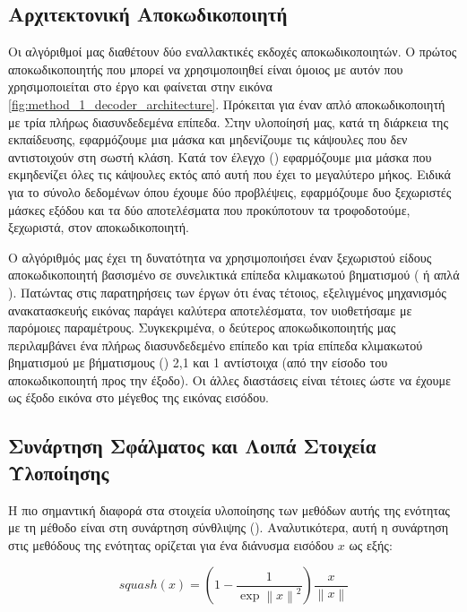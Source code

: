 \subsection{Αρχιτεκτονική Αποκωδικοποιητή}

Οι αλγόριθμοί μας διαθέτουν δύο εναλλακτικές εκδοχές αποκωδικοποιητών. Ο πρώτος αποκωδικοποιητής που μπορεί να χρησιμοποιηθεί είναι όμοιος με αυτόν που χρησιμοποιείται στο έργο \cite{sabour2017dynamic} και φαίνεται στην εικόνα \ref{fig:method_1_decoder_architecture}. Πρόκειται για έναν απλό αποκωδικοποιητή με τρία πλήρως διασυνδεδεμένα επίπεδα. Στην υλοποίησή μας, κατά τη διάρκεια της εκπαίδευσης, εφαρμόζουμε μια μάσκα και μηδενίζουμε τις κάψουλες που δεν αντιστοιχούν στη σωστή κλάση. Κατά τον έλεγχο () εφαρμόζουμε μια μάσκα που εκμηδενίζει όλες τις κάψουλες εκτός από αυτή που έχει το μεγαλύτερο μήκος. Ειδικά για το σύνολο δεδομένων  όπου έχουμε δύο προβλέψεις, εφαρμόζουμε δυο ξεχωριστές μάσκες εξόδου και τα δύο αποτελέσματα που προκύποτουν τα τροφοδοτούμε, ξεχωριστά, στον αποκωδικοποιητή.\par

Ο αλγόριθμός μας έχει τη δυνατότητα να χρησιμοποιήσει έναν ξεχωριστού είδους αποκωδικοποιητή βασισμένο σε συνελικτικά επίπεδα κλιμακωτού βηματισμού ( ή απλά ). Πατώντας στις παρατηρήσεις των έργων \cite{shiri2020quick,liu2019fsc,luo2020capsnet} ότι ένας τέτοιος, εξελιγμένος μηχανισμός ανακατασκευής εικόνας παράγει καλύτερα αποτελέσματα, τον υιοθετήσαμε με παρόμοιες παραμέτρους. Συγκεκριμένα, ο δεύτερος αποκωδικοποιητής μας περιλαμβάνει ένα πλήρως διασυνδεδεμένο επίπεδο και τρία επίπεδα κλιμακωτού βηματισμού με βήματισμους () 2,1 και 1 αντίστοιχα (από την είσοδο του αποκωδικοποιητή προς την έξοδο). Οι άλλες διαστάσεις είναι τέτοιες ώστε να έχουμε ως έξοδο εικόνα στο μέγεθος της εικόνας εισόδου.

\subsection{Συνάρτηση Σφάλματος και Λοιπά Στοιχεία Υλοποίησης}
Η πιο σημαντική διαφορά στα στοιχεία υλοποίησης των μεθόδων αυτής της ενότητας με τη μέθοδο \cite{sabour2017dynamic} είναι στη συνάρτηση σύνθλιψης (). Αναλυτικότερα, αυτή η συνάρτηση στις μεθόδους της ενότητας ορίζεται για ένα διάνυσμα εισόδου $x$ ως εξής\cite{mazzia2021efficient}:

\begin{equation}
    squash(x) = (1 - \frac{1}{\exp{\left\lVert x\right\rVert^2}}) \frac{x}{\left\lVert x\right\rVert}
\end{equation}

